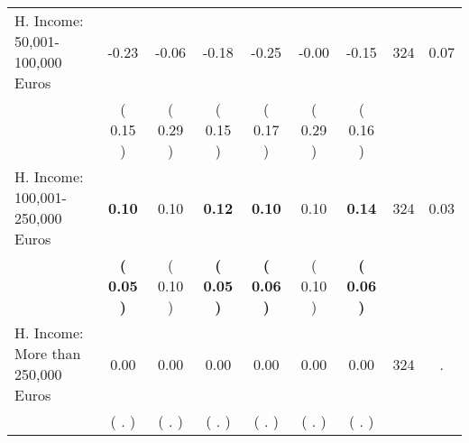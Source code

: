\begin{tabular}{lcccccccc}
H. Income: 50,001-100,000 Euros &     -0.23 &     -0.06 &     -0.18 &     -0.25 &     -0.00 &     -0.15 & 324 &       0.07 \\ 
 & (     0.15 ) & (     0.29 ) & (     0.15 ) & (     0.17 ) & (     0.29 ) & (     0.16 ) & \\
H. Income: 100,001-250,000 Euros & \textbf{     0.10} &      0.10 & \textbf{     0.12} & \textbf{     0.10} &      0.10 & \textbf{     0.14} & 324 &       0.03 \\ 
 & \textbf{(     0.05 )} & (     0.10 ) & \textbf{(     0.05 )} & \textbf{(     0.06 )} & (     0.10 ) & \textbf{(     0.06 )} & \\
H. Income: More than 250,000 Euros &      0.00 &      0.00 &      0.00 &      0.00 &      0.00 &      0.00 & 324 &          . \\ 
 & (        . ) & (        . ) & (        . ) & (        . ) & (        . ) & (        . ) & \\
\bottomrule
\end{tabular}
